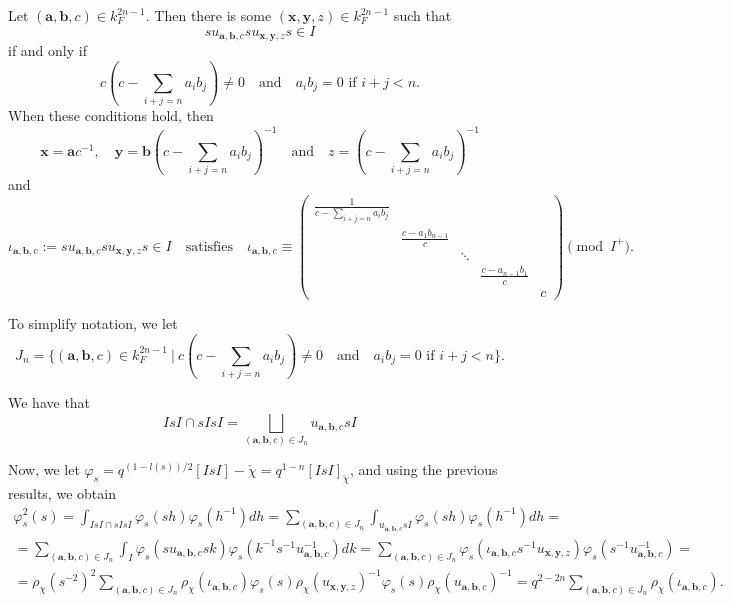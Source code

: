     \begin{lemma}
        Let $(\mathbf{a},\mathbf{b},c)\in k_F^{2n-1}$. Then there is some $(\mathbf{x},\mathbf{y},z)\in k_F^{2n-1}$ such that 
        $$su_{\mathbf{a},\mathbf{b},c}su_{\mathbf{x},\mathbf{y},z}s\in I$$
        if and only if 
        \begin{equation*}
        c(c-\sum_{i+j=n}a_ib_j)\neq0\quad\text{and}\quad a_ib_j=0 \text{  if  } i+j<n.
        \end{equation*}
        When these conditions hold, then 
        $$\mathbf{x}=\mathbf{a}c^{-1},\quad \mathbf{y}=\mathbf{b}(c-\sum_{i+j=n}a_ib_j)^{-1}\quad\text{and}\quad z=(c-\sum_{i+j=n}a_ib_j)^{-1}$$
        and 
        \begin{equation}
            \iota_{\mathbf{a},\mathbf{b},c}:=su_{\mathbf{a},\mathbf{b},c}su_{\mathbf{x},\mathbf{y},z}s\in I\quad\text{satisfies}\quad \iota_{\mathbf{a},\mathbf{b},c}\equiv
            \begin{pmatrix}
                \frac{1}{c-\sum_{i+j=n}a_ib_j}&&&& \\
                &\frac{c-a_1b_{n-1}}{c}&&& \\
                &&\ddots&& \\
                &&&\frac{c-a_{n-1}b_1}{c}& \\
                &&&&c
            \end{pmatrix}
            \pmod{I^+}.
        \end{equation}
    \end{lemma}
    To simplify notation, we let $$J_n=\{(\mathbf{a},\mathbf{b},c)\in k_F^{2n-1}\ |\ c(c-\sum_{i+j=n}a_ib_j)\neq0\quad\text{and}\quad a_ib_j=0 \text{  if  } i+j<n\}.$$
    \begin{cor}\label{cor_sIsI}
        We have that
        $$IsI\cap sIsI=\bigsqcup_{(\mathbf{a},\mathbf{b},c)\in J_n}u_{\mathbf{a},\mathbf{b},c}sI$$
    \end{cor}

    Now, we let $\varphi_s=q^{(1-l(s))/2}[IsI]-{\check{\chi}}=q^{1-n}[IsI]_{\check{\chi}}$, and using the previous results, we obtain
    \begin{align*}
        \varphi_s^2(s)=\int_{IsI\cap sIsI}\varphi_s(sh)\varphi_s(h^{-1})dh=\sum_{(\mathbf{a},\mathbf{b},c)\in J_n}\int_{u_{\mathbf{a},\mathbf{b},c}sI}\varphi_s(sh)\varphi_s(h^{-1})dh=\\
        =\sum_{(\mathbf{a},\mathbf{b},c)\in J_n}\int_{I}\varphi_s(su_{\mathbf{a},\mathbf{b},c}sk)\varphi_s(k^{-1}s^{-1}u_{\mathbf{a},\mathbf{b},c}^{-1})dk=\sum_{(\mathbf{a},\mathbf{b},c)\in J_n}\varphi_s(\iota_{\mathbf{a},\mathbf{b},c}s^{-1}u_{\mathbf{x},\mathbf{y},z})\varphi_s(s^{-1}u_{\mathbf{a},\mathbf{b},c}^{-1})=\\
        =\rho_\chi(s^{-2})^2\sum_{(\mathbf{a},\mathbf{b},c)\in J_n}\rho_\chi(\iota_{\mathbf{a},\mathbf{b},c})\varphi_s(s)\rho_\chi(u_{\mathbf{x},\mathbf{y},z})^{-1}\varphi_s(s)\rho_\chi(u_{\mathbf{a},\mathbf{b},c})^{-1}=q^{2-2n}\sum_{(\mathbf{a},\mathbf{b},c)\in J_n}\rho_\chi(\iota_{\mathbf{a},\mathbf{b},c}).
    \end{align*}

